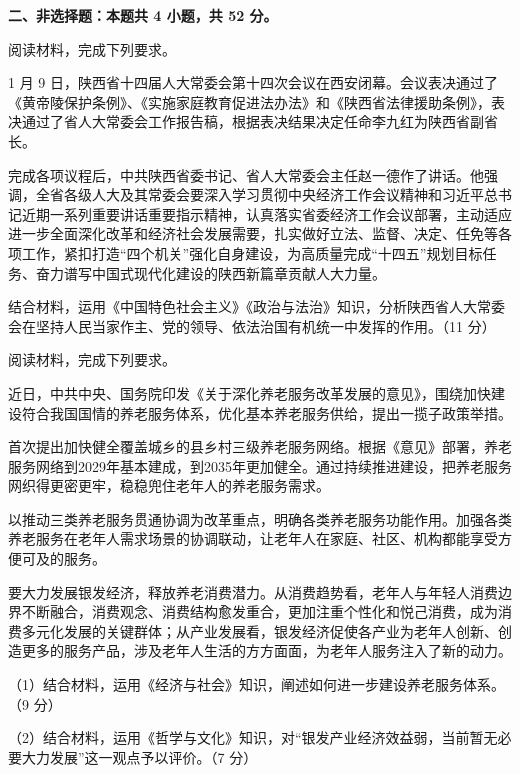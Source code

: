 \documentclass{exam-zh}
\newenvironment{kaiti-indented}{
  \parindent=2em
  \CJKfamily{zhkai}
  \setstretch{1.4}
}{
}
\begin{document}
\begin{flushleft}
  {\bfseries 二、非选择题：本题共 4 小题，共 52 分。}
\end{flushleft}

\begin{question}
  阅读材料，完成下列要求。

  \begin{kaiti-indented}
    1 月 9 日，陕西省十四届人大常委会第十四次会议在西安闭幕。会议表决通过了《黄帝陵保护条例》、《实施家庭教育促进法办法》和《陕西省法律援助条例》，表决通过了省人大常委会工作报告稿，根据表决结果决定任命李九红为陕西省副省长。

    完成各项议程后，中共陕西省委书记、省人大常委会主任赵一德作了讲话。他强调，全省各级人大及其常委会要深入学习贯彻中央经济工作会议精神和习近平总书记近期一系列重要讲话重要指示精神，认真落实省委经济工作会议部署，主动适应进一步全面深化改革和经济社会发展需要，扎实做好立法、监督、决定、任免等各项工作，紧扣打造“四个机关”强化自身建设，为高质量完成“十四五”规划目标任务、奋力谱写中国式现代化建设的陕西新篇章贡献人大力量。
  \end{kaiti-indented}

  结合材料，运用《中国特色社会主义》《政治与法治》知识，分析陕西省人大常委会在坚持人民当家作主、党的领导、依法治国有机统一中发挥的作用。（11 分）
\end{question}

\begin{question}
  阅读材料，完成下列要求。

  \begin{kaiti-indented}
    近日，中共中央、国务院印发《关于深化养老服务改革发展的意见》，围绕加快建设符合我国国情的养老服务体系，优化基本养老服务供给，提出一揽子政策举措。

    首次提出加快健全覆盖城乡的县乡村三级养老服务网络。根据《意见》部署，养老服务网络到2029年基本建成，到2035年更加健全。通过持续推进建设，把养老服务网织得更密更牢，稳稳兜住老年人的养老服务需求。

    以推动三类养老服务贯通协调为改革重点，明确各类养老服务功能作用。加强各类养老服务在老年人需求场景的协调联动，让老年人在家庭、社区、机构都能享受方便可及的服务。

    要大力发展银发经济，释放养老消费潜力。从消费趋势看，老年人与年轻人消费边界不断融合，消费观念、消费结构愈发重合，更加注重个性化和悦己消费，成为消费多元化发展的关键群体；从产业发展看，银发经济促使各产业为老年人创新、创造更多的服务产品，涉及老年人生活的方方面面，为老年人服务注入了新的动力。
  \end{kaiti-indented}

  （1）结合材料，运用《经济与社会》知识，阐述如何进一步建设养老服务体系。（9 分）

  （2）结合材料，运用《哲学与文化》知识，对“银发产业经济效益弱，当前暂无必要大力发展”这一观点予以评价。（7 分）
\end{question}
\end{document}
